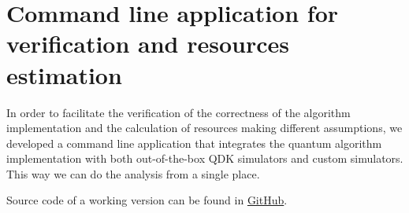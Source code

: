 \section{Command line application for verification and resources estimation}

In order to facilitate the verification of the correctness of the algorithm implementation and the calculation of resources making different assumptions, we developed a command line application that integrates the quantum algorithm implementation with both out-of-the-box QDK simulators and custom simulators. This way we can do the analysis from a single place.

Source code of a working version can be found in \href{https://github.com/cesarzc/uw-master-in-physics-project}{GitHub}.
